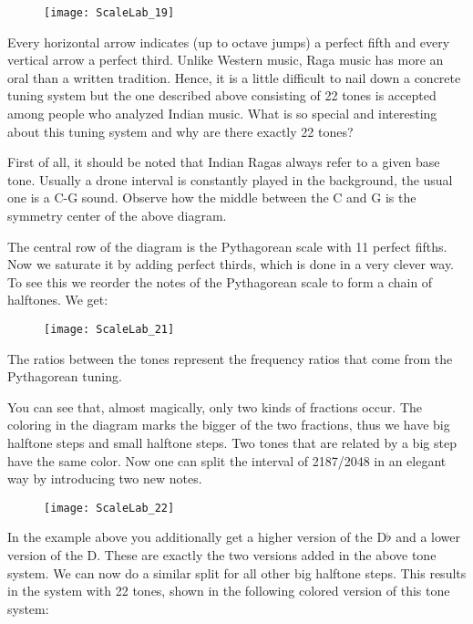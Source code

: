 \begin{figure}[h]
\centering
\texttt{[image: ScaleLab\_19]}
\end{figure}


Every horizontal arrow indicates (up to octave jumps) a perfect fifth and every vertical arrow a perfect third. Unlike Western music, Raga music has more an oral than a written tradition. Hence, it is a little difficult to nail down a concrete tuning system but the one described above consisting of 22 tones is accepted among people who analyzed Indian music. What is so special and interesting about this tuning system and why are there exactly 22 tones?

First of all, it should be noted that Indian Ragas always refer to a given base tone. Usually a drone interval is constantly played in the background, the usual one is a C-G sound. Observe how the middle between the C and G is the symmetry center of the above diagram.

The central row of the diagram is the Pythagorean scale with 11 perfect fifths. Now we saturate it by adding perfect thirds, which is done in a very clever way. To see this we reorder the notes of the Pythagorean scale to form a chain of halftones. We get:

\begin{figure}[h]
\centering
\texttt{[image: ScaleLab\_21]}
\end{figure}

The ratios between the tones represent the frequency ratios that come from the Pythagorean tuning.

You can see that, almost magically, only two kinds of fractions occur. The coloring in the diagram marks the bigger of the two fractions, thus we have big halftone steps and small halftone steps. Two tones that are related by a big step have the same color. Now one can split the interval of 2187/2048 in an elegant way by introducing two new notes.

\begin{figure}[h]
\centering
\texttt{[image: ScaleLab\_22]}
\end{figure}

In the example above you additionally get a higher version of the D$\flat$   and a lower version of the D. These are exactly the two versions added in the above tone system. We can now do a similar split for all other big halftone steps. This results in the system with 22 tones, shown in the following colored version of this tone system:


